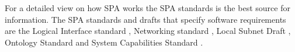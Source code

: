 For a detailed view on how SPA works the SPA standards is the best source for
information. The SPA standards and drafts that specify software requirements
are the Logical Interface standard \cite{spa:logical-interface}, Networking
standard \cite{spa:networking}, Local Subnet Draft \cite{spa:local-subnet},
Ontology Standard \cite{spa:ontology} and System Capabilities Standard
\cite{spa:system-capabilities}.


%
